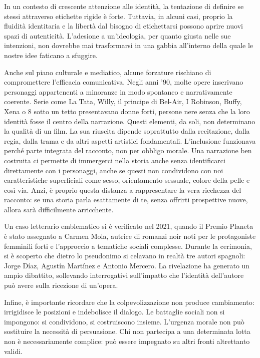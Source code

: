 \documentclass[12pt]{book} %
\begin{document}
In un contesto di crescente attenzione alle identità, la tentazione di definire se stessi attraverso etichette rigide è forte. Tuttavia, in alcuni casi, proprio la fluidità identitaria e la libertà dal bisogno di etichettarsi possono aprire nuovi spazi di autenticità. L’adesione a un’ideologia, per quanto giusta nelle sue intenzioni, non dovrebbe mai trasformarsi in una gabbia all'interno della quale le nostre idee faticano a sfuggire.

Anche sul piano culturale e mediatico, alcune forzature rischiano di compromettere l’efficacia comunicativa. Negli anni ’90, molte opere inserivano personaggi appartenenti a minoranze in modo spontaneo e narrativamente coerente. Serie come La Tata, Willy, il principe di Bel-Air, I Robinson, Buffy, Xena o 8 sotto un tetto presentavano donne forti, persone nere senza che la loro identità fosse il centro della narrazione. Questi elementi, da soli, non determinano la qualità di un film. La sua riuscita dipende soprattutto dalla recitazione, dalla regia, dalla trama e da altri aspetti artistici fondamentali. L’inclusione funzionava perché parte integrata del racconto, non per obbligo morale.
Una narrazione ben costruita ci permette di immergerci nella storia anche senza identificarci direttamente con i personaggi, anche se questi non condividono con noi caratteristiche superficiali come sesso, orientamento sessuale, colore della pelle e così via. Anzi, è proprio questa distanza a rappresentare la vera ricchezza del racconto: se una storia parla esattamente di te, senza offrirti prospettive nuove, allora sarà difficilmente arricchente.

Un caso letterario emblematico si è verificato nel 2021, quando il Premio Planeta è stato assegnato a Carmen Mola, autrice di romanzi noir noti per le protagoniste femminili forti e l’approccio a tematiche sociali complesse. Durante la cerimonia, si è scoperto che dietro lo pseudonimo si celavano in realtà tre autori spagnoli: Jorge Díaz, Agustín Martínez e Antonio Mercero. La rivelazione ha generato un ampio dibattito, sollevando interrogativi sull’impatto che l’identità dell’autore può avere sulla ricezione di un’opera. 

Infine, è importante ricordare che la colpevolizzazione non produce cambiamento: irrigidisce le posizioni e indebolisce il dialogo. Le battaglie sociali non si impongono: si condividono, si costruiscono insieme. L’urgenza morale non può sostituire la necessità di persuasione. Chi non partecipa a una determinata lotta non è necessariamente complice: può essere impegnato su altri fronti altrettanto validi.
\end{document}
